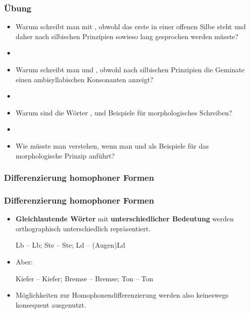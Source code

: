 \begin{frame}
\frametitle{Übung}

\begin{itemize}
	\item Warum schreibt man  mit , obwohl das erste  in einer offenen Silbe steht und daher nach silbischen Prinzipien sowieso lang gesprochen werden müsste?
	\item[]
	\item Warum schreibt man  und , obwohl nach silbischen Prinzipien die Geminate einen ambisyllabischen Konsonanten anzeigt?
	\item[]
	\item Warum sind die Wörter ,  und  Beispiele für morphologisches Schreiben?
	\item[]
	\item Wie müsste man  verstehen, wenn man  und  als Beispiele für das morphologische Prinzip anführt?
\end{itemize}


\end{frame}




\subsubsection{Differenzierung homophoner Formen}


\begin{frame}
\frametitle{Differenzierung homophoner Formen}

\begin{itemize}
	\item \textbf{Gleichlautende Wörter} mit \textbf{unterschiedlicher Bedeutung} werden orthographisch unterschiedlich repräsentiert.
	
	\ea Lb -- Lb; Ste -- Ste; Ld -- (Augen)Ld
	\z
	
	\item Aber:
	
	\ea Kiefer -- Kiefer; Bremse -- Bremse; Ton -- Ton
	\z
	
	\item Möglichkeiten zur Homophonendifferenzierung werden also keineswegs konsequent ausgenutzt.
\end{itemize}

\end{frame}


